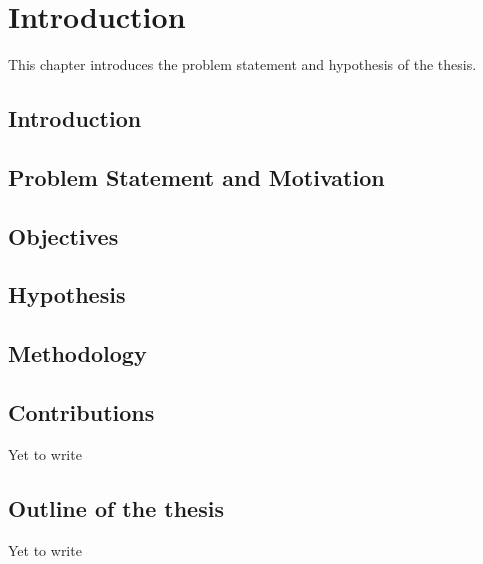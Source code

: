 \chapter{Introduction}
\label{ch:Introduction}

This chapter introduces the problem statement and hypothesis of the thesis.

\section{Introduction}
\label{sec:Introduction}


\section{Problem Statement and Motivation}
\label{sec:ProblemDefinition}


\section{Objectives}
\label{sec:Objectives}


\section{Hypothesis}
\label{sec:Hypothesis}


\section{Methodology}
\label{sec:Methodology}


\section{Contributions}
Yet to write

\section{Outline of the thesis}
Yet to write
